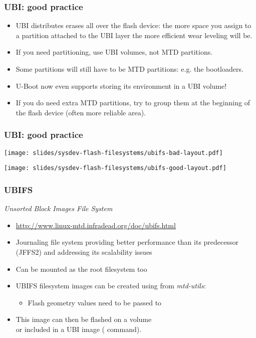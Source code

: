 \begin{frame}
  \frametitle{UBI: good practice}
  \begin{itemize}
  \item UBI distributes erases all over the flash device: the more space
    you assign to a partition attached to the UBI layer the more efficient
    wear leveling will be.
  \item If you need partitioning, use UBI volumes, not MTD partitions.
  \item Some partitions will still have to be MTD partitions: e.g. the
    bootloaders.
  \item U-Boot now even supports storing its environment in a UBI volume!
  \item If you do need extra MTD partitions, try to group them at the
    beginning of the flash device (often more reliable area).
  \end{itemize}
\end{frame}

\begin{frame}
  \frametitle{UBI: good practice}
  \begin{center}
    \texttt{[image: slides/sysdev-flash-filesystems/ubifs-bad-layout.pdf]}
  \end{center}

  \begin{center}
    \texttt{[image: slides/sysdev-flash-filesystems/ubifs-good-layout.pdf]}
  \end{center}
\end{frame}

\begin{frame}
  \frametitle{UBIFS}
  {\em Unsorted Block Images File System}
  \begin{itemize}
  \item \url{http://www.linux-mtd.infradead.org/doc/ubifs.html}
  \item Journaling file system providing better performance than
        its predecessor (JFFS2) and addressing its scalability issues
  \item Can be mounted as the root filesystem too
  \item UBIFS filesystem images can be created using 
        from {\em mtd-utils}:\\
      \begin{itemize}
        \item Flash geometry values need to be passed to 
      \end{itemize}
  \item This image can then be flashed on a volume\\
        or included in a UBI image ( command).
  \end{itemize}
\end{frame}

